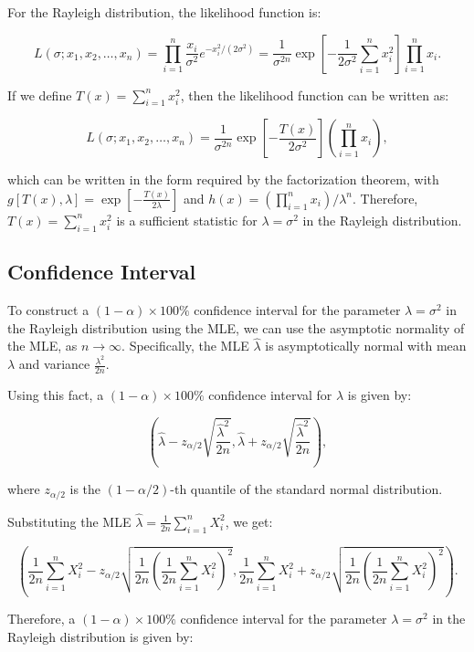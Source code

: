 \documentclass[11pt]{article}
\begin{document}
For the Rayleigh distribution, the likelihood function is:

$$L(\sigma; x_1, x_2, \ldots, x_n) = \prod_{i=1}^n \frac{x_i}{\sigma^2}e^{-x_i^2/(2\sigma^2)} = \frac{1}{\sigma^{2n}}\exp\left[-\frac{1}{2\sigma^2}\sum_{i=1}^n x_i^2\right]\prod_{i=1}^n x_i.$$

If we define $T(x) = \sum_{i=1}^n x_i^2$, then the likelihood function can be written as:

$$L(\sigma; x_1, x_2, \ldots, x_n) = \frac{1}{\sigma^{2n}}\exp\left[-\frac{T(x)}{2\sigma^2}\right] \left(\prod_{i=1}^n x_i\right),$$

which can be written in the form required by the factorization theorem, with $g[T(x),\lambda] = \exp\left[-\frac{T(x)}{2\lambda}\right]$ and $h(x) = \left(\prod_{i=1}^n x_i\right)/\lambda^n$. Therefore, $T(x) = \sum_{i=1}^n x_i^2$ is a sufficient statistic for $\lambda = \sigma^2$ in the Rayleigh distribution.

\subsection*{Confidence Interval}

To construct a $(1-\alpha)\times 100\%$ confidence interval for the parameter $\lambda=\sigma^2$ in the Rayleigh distribution using the MLE, we can use the asymptotic normality of the MLE, as $n\rightarrow \infty$. Specifically, the MLE $\hat{\lambda}$ is asymptotically normal with mean $\lambda$ and variance $\frac{\lambda^2}{2n}$.

Using this fact, a $(1-\alpha)\times 100\%$ confidence interval for $\lambda$ is given by:

$$ \left(\hat{\lambda} - z_{\alpha/2}\sqrt{\frac{\hat{\lambda}^2}{2n}}, \hat{\lambda} + z_{\alpha/2}\sqrt{\frac{\hat{\lambda}^2}{2n}}\right), $$

where $z_{\alpha/2}$ is the $(1 - \alpha/2)$-th quantile of the standard normal distribution.

Substituting the MLE $\hat{\lambda} = \frac{1}{2n} \sum_{i=1}^n X_i^2$, we get:

$$ \left(\frac{1}{2n}\sum_{i=1}^n X_i^2 - z_{\alpha/2}\sqrt{\frac{1}{2n}\left(\frac{1}{2n}\sum_{i=1}^n X_i^2\right)^2}, \frac{1}{2n}\sum_{i=1}^n X_i^2 + z_{\alpha/2}\sqrt{\frac{1}{2n}\left(\frac{1}{2n}\sum_{i=1}^n X_i^2\right)^2}\right). $$

Therefore, a $(1-\alpha)\times 100\%$ confidence interval for the parameter $\lambda=\sigma^2$ in the Rayleigh distribution is given by:
\end{document}
